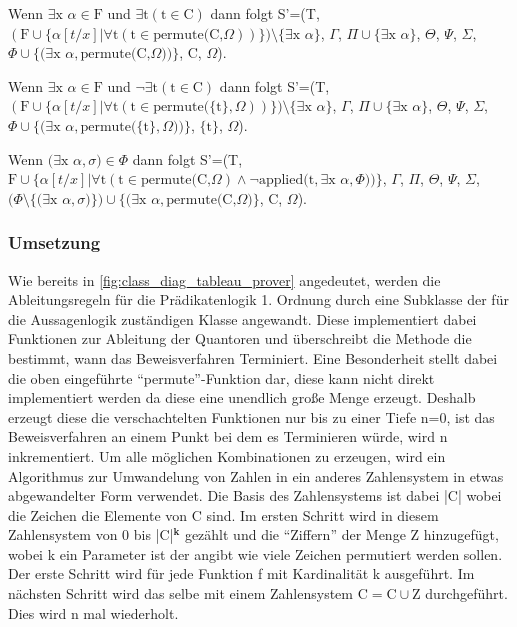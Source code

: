 Wenn $\exists\textrm{x}$ $\alpha\in\textrm{F}$ und $\exists\textrm{t}(\textrm{t}\in\textrm{C})$ dann folgt S'=(T, $(\textrm{F}\cup\lbrace\alpha[t/x]|\forall\textrm{t}(\textrm{t}\in\textrm{permute(C,}\Omega))\rbrace)\setminus\lbrace\exists\textrm{x}$ $\alpha\rbrace$, $\Gamma$, $\Pi\cup\lbrace\exists\textrm{x}$ $\alpha\rbrace$, $\Theta$, $\Psi$, $\Sigma$, $\Phi\cup\lbrace(\exists\textrm{x}$ $\alpha,\textrm{permute(C,}\Omega))\rbrace$, C, $\Omega$).

Wenn $\exists\textrm{x}$ $\alpha\in\textrm{F}$ und $\neg\exists\textrm{t}(\textrm{t}\in\textrm{C})$ dann folgt S'=(T, $(\textrm{F}\cup\lbrace\alpha[t/x]|\forall\textrm{t}(\textrm{t}\in\textrm{permute(}\lbrace\textrm{t}\rbrace,\Omega))\rbrace)\setminus\lbrace\exists\textrm{x}$ $\alpha\rbrace$, $\Gamma$, $\Pi\cup\lbrace\exists\textrm{x}$ $\alpha\rbrace$, $\Theta$, $\Psi$, $\Sigma$, $\Phi\cup\lbrace(\exists\textrm{x}$ $\alpha,\textrm{permute(}\lbrace\textrm{t}\rbrace,\Omega))\rbrace$, $\lbrace\textrm{t}\rbrace$, $\Omega$).

Wenn $(\exists\textrm{x}$ $\alpha, \sigma)\in\Phi$ dann folgt S'=(T, $\textrm{F}\cup\lbrace\alpha[t/x]|\forall\textrm{t}(\textrm{t}\in\textrm{permute(C,}\Omega)\wedge\neg\textrm{applied(t},\exists\textrm{x}$ $\alpha, \Phi))\rbrace$, $\Gamma$, $\Pi$, $\Theta$, $\Psi$, $\Sigma$, $(\Phi\setminus\lbrace(\exists\textrm{x}$ $\alpha, \sigma)\rbrace)\cup\lbrace(\exists\textrm{x}$ $\alpha,\textrm{permute(C,}\Omega)\rbrace$, C, $\Omega$).

\subsubsection{Umsetzung}
Wie bereits in \autoref{fig:class_diag_tableau_prover} angedeutet, werden die Ableitungsregeln für die Prädikatenlogik 1. Ordnung durch eine Subklasse der für die Aussagenlogik zuständigen Klasse angewandt. Diese implementiert dabei Funktionen zur Ableitung der Quantoren und überschreibt die Methode die bestimmt, wann das Beweisverfahren Terminiert. Eine Besonderheit stellt dabei die oben eingeführte ``permute''-Funktion dar, diese kann nicht direkt implementiert werden da diese eine unendlich große Menge erzeugt. Deshalb erzeugt diese die verschachtelten Funktionen nur bis zu einer Tiefe n=0, ist das Beweisverfahren an einem Punkt bei dem es Terminieren würde, wird n inkrementiert. Um alle möglichen Kombinationen zu erzeugen, wird ein Algorithmus zur Umwandelung von Zahlen in ein anderes Zahlensystem in etwas abgewandelter Form verwendet. Die Basis des Zahlensystems ist dabei |C| wobei die Zeichen die Elemente von C sind. Im ersten Schritt wird in diesem Zahlensystem von 0 bis |C|$^{\textbf{k}}$ gezählt und die ``Ziffern'' der Menge Z hinzugefügt, wobei k ein Parameter ist der angibt wie viele Zeichen permutiert werden sollen. Der erste Schritt wird für jede Funktion f mit Kardinalität k ausgeführt. Im nächsten Schritt wird das selbe mit einem Zahlensystem $\textrm{C}=\textrm{C}\cup\textrm{Z}$ durchgeführt. Dies wird n mal wiederholt.

